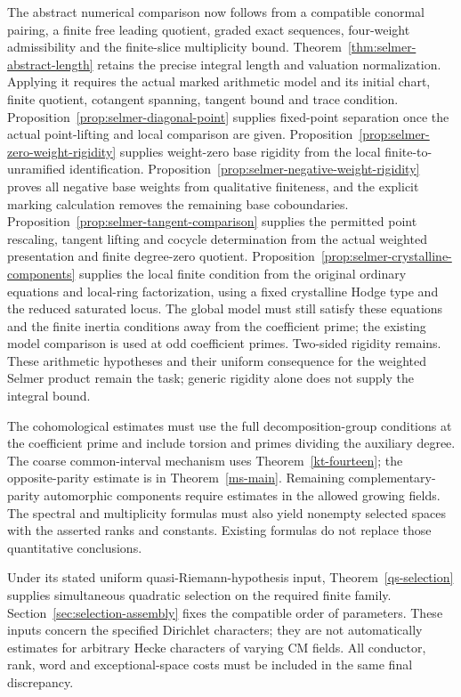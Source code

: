 The abstract numerical comparison now follows from a compatible conormal
pairing, a finite free leading quotient, graded exact sequences,
four-weight admissibility and the finite-slice multiplicity bound.
Theorem~\ref{thm:selmer-abstract-length} retains the precise
integral length and valuation normalization. Applying it requires the
actual marked arithmetic model and its initial chart, finite quotient,
cotangent spanning, tangent bound and trace condition.
Proposition~\ref{prop:selmer-diagonal-point} supplies fixed-point
separation once the actual point-lifting and local comparison are given.
Proposition~\ref{prop:selmer-zero-weight-rigidity} supplies weight-zero
base rigidity from the local finite-to-unramified identification.
Proposition~\ref{prop:selmer-negative-weight-rigidity} proves all
negative base weights from qualitative finiteness, and the explicit
marking calculation removes the remaining base coboundaries.
Proposition~\ref{prop:selmer-tangent-comparison} supplies the permitted
point rescaling, tangent lifting and cocycle determination from the
actual weighted presentation and finite degree-zero quotient.
Proposition~\ref{prop:selmer-crystalline-components} supplies the local
finite condition from the original ordinary equations and local-ring
factorization, using a fixed crystalline Hodge type and the reduced
saturated locus. The global model must still satisfy these equations
and the finite inertia conditions away from the coefficient prime;
the existing model comparison is used at odd coefficient primes.
Two-sided rigidity remains. These arithmetic hypotheses and their uniform consequence for the
weighted Selmer product remain the task; generic rigidity alone does
not supply the integral bound.

The cohomological estimates must use the full decomposition-group
conditions at the coefficient prime and include torsion and primes
dividing the auxiliary degree. The coarse common-interval mechanism
uses Theorem~\ref{kt-fourteen}; the opposite-parity estimate is in
Theorem~\ref{ms-main}. Remaining complementary-parity automorphic
components require estimates in the allowed growing fields.
The spectral and multiplicity formulas must also yield nonempty
selected spaces with the asserted ranks and constants. Existing
formulas do not replace those quantitative conclusions.

Under its stated uniform quasi-Riemann-hypothesis input,
Theorem~\ref{qs-selection} supplies simultaneous quadratic selection
on the required finite family. Section~\ref{sec:selection-assembly}
fixes the compatible order of parameters. These inputs concern the
specified Dirichlet characters; they are not automatically estimates
for arbitrary Hecke characters of varying CM fields. All conductor,
rank, word and exceptional-space costs must be included in the same
final discrepancy.

